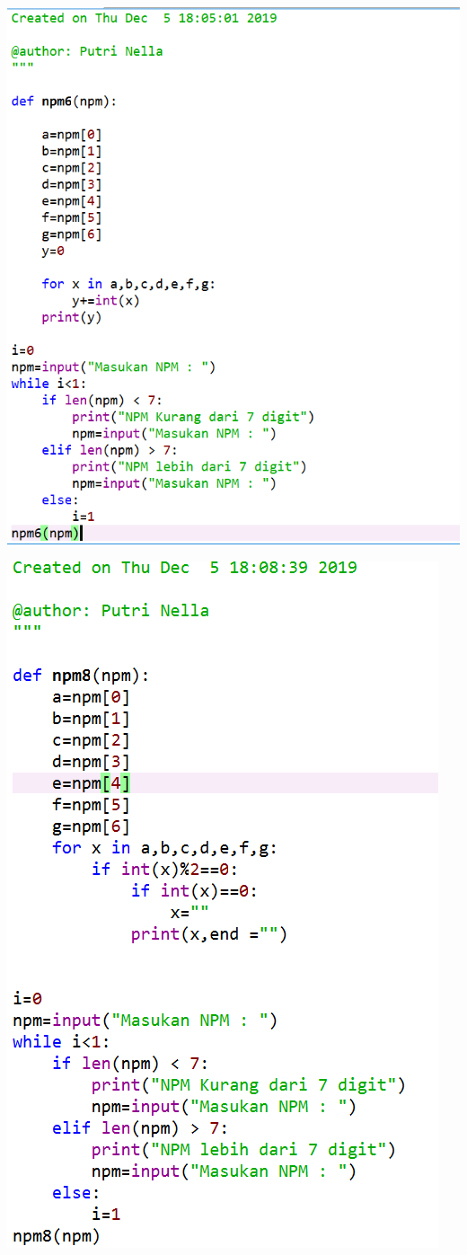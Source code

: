 \documentclass[a4paper, 12pt]{article}
\begin{document}
\item
\begin{center}
\includegraphics[width=.8\textwidth]{figure/6.PNG}
\end{center}
\item
\begin{center}
\includegraphics[width=.8\textwidth]{figure/7.PNG}
\end{center}
\end{document}
